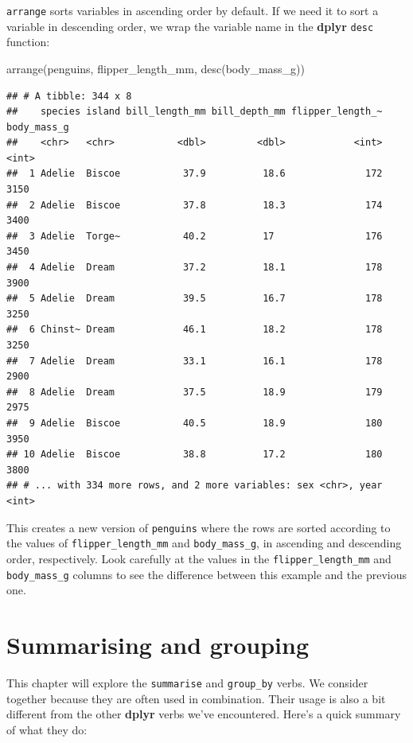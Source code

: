 \documentclass[
]{book}
\newenvironment{Shaded}{\begin{snugshade}}{\end{snugshade}}
\newcommand{\FunctionTok}[1]{\textcolor[rgb]{0.00,0.00,0.00}{#1}}
\newcommand{\NormalTok}[1]{#1}
\begin{document}
\texttt{arrange} sorts variables in ascending order by default. If we need it to sort a variable in descending order, we wrap the variable name in the \textbf{dplyr} \texttt{desc} function:

\begin{Shaded}
\begin{Highlighting}[]
\FunctionTok{arrange}\NormalTok{(penguins, flipper\_length\_mm, }\FunctionTok{desc}\NormalTok{(body\_mass\_g))}
\end{Highlighting}
\end{Shaded}

\begin{verbatim}
## # A tibble: 344 x 8
##    species island bill_length_mm bill_depth_mm flipper_length_~ body_mass_g
##    <chr>   <chr>           <dbl>         <dbl>            <int>       <int>
##  1 Adelie  Biscoe           37.9          18.6              172        3150
##  2 Adelie  Biscoe           37.8          18.3              174        3400
##  3 Adelie  Torge~           40.2          17                176        3450
##  4 Adelie  Dream            37.2          18.1              178        3900
##  5 Adelie  Dream            39.5          16.7              178        3250
##  6 Chinst~ Dream            46.1          18.2              178        3250
##  7 Adelie  Dream            33.1          16.1              178        2900
##  8 Adelie  Dream            37.5          18.9              179        2975
##  9 Adelie  Biscoe           40.5          18.9              180        3950
## 10 Adelie  Biscoe           38.8          17.2              180        3800
## # ... with 334 more rows, and 2 more variables: sex <chr>, year <int>
\end{verbatim}

This creates a new version of \texttt{penguins} where the rows are sorted according to the values of \texttt{flipper\_length\_mm} and \texttt{body\_mass\_g}, in ascending and descending order, respectively. Look carefully at the values in the \texttt{flipper\_length\_mm} and \texttt{body\_mass\_g} columns to see the difference between this example and the previous one.

\hypertarget{summarising-and-grouping}{%
\chapter{Summarising and grouping}\label{summarising-and-grouping}}

This chapter will explore the \texttt{summarise} and \texttt{group\_by} verbs. We consider together because they are often used in combination. Their usage is also a bit different from the other \textbf{dplyr} verbs we've encountered. Here's a quick summary of what they do:
\end{document}
